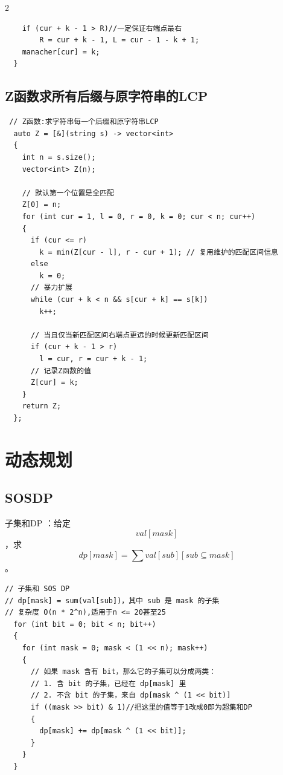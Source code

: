 \documentclass[10pt]{article}
\begin{document}
\begin{multicols*}{2}
\begin{verbatim}
    if (cur + k - 1 > R)//一定保证右端点最右
    	R = cur + k - 1, L = cur - 1 - k + 1;
    manacher[cur] = k;
  }
\end{verbatim}


\subsection{Z函数求所有后缀与原字符串的LCP}


\begin{verbatim}
 // Z函数:求字符串每一个后缀和原字符串LCP
  auto Z = [&](string s) -> vector<int>
  {
    int n = s.size();
    vector<int> Z(n);

    // 默认第一个位置是全匹配
    Z[0] = n;
    for (int cur = 1, l = 0, r = 0, k = 0; cur < n; cur++)
    {
      if (cur <= r)
        k = min(Z[cur - l], r - cur + 1); // 复用维护的匹配区间信息
      else
        k = 0;
      // 暴力扩展
      while (cur + k < n && s[cur + k] == s[k])
        k++;

      // 当且仅当新匹配区间右端点更远的时候更新匹配区间
      if (cur + k - 1 > r)
        l = cur, r = cur + k - 1;
      // 记录Z函数的值
      Z[cur] = k;
    }
    return Z;
  };
\end{verbatim}




\section{动态规划}


\subsection{SOSDP}


子集和DP ：给定 $$ val[mask]$$，求 $$ dp[mask] = \sum{  val[sub] [sub ⊆ mask ]}$$  。 \par

\begin{verbatim}
// 子集和 SOS DP
// dp[mask] = sum(val[sub])，其中 sub 是 mask 的子集
// 复杂度 O(n * 2^n),适用于n <= 20甚至25
  for (int bit = 0; bit < n; bit++)
  {
    for (int mask = 0; mask < (1 << n); mask++)
    {
      // 如果 mask 含有 bit，那么它的子集可以分成两类：
      // 1. 含 bit 的子集，已经在 dp[mask] 里
      // 2. 不含 bit 的子集，来自 dp[mask ^ (1 << bit)]
      if ((mask >> bit) & 1)//把这里的值等于1改成0即为超集和DP
      {
        dp[mask] += dp[mask ^ (1 << bit)];
      }
    }
  }
\end{verbatim}



\end{multicols*}
\end{document}
